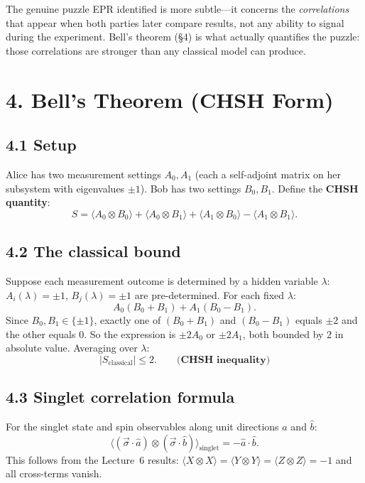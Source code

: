 \documentclass[12pt,a4paper]{article}
\begin{document}
The genuine puzzle EPR identified is more subtle---it concerns the \emph{correlations} that appear when both parties later compare results, not any ability to signal during the experiment.  Bell's theorem (\S4) is what actually quantifies the puzzle: those correlations are stronger than any classical model can produce.

\section{4. Bell's Theorem (CHSH Form)}

\subsection{4.1 Setup}
Alice has two measurement settings $A_0, A_1$ (each a self-adjoint matrix on her subsystem with eigenvalues $\pm 1$).  Bob has two settings $B_0, B_1$.  Define the \textbf{CHSH quantity}:
\[
    \boxed{S = \langle A_0 \otimes B_0\rangle + \langle A_0 \otimes B_1\rangle + \langle A_1 \otimes B_0\rangle - \langle A_1 \otimes B_1\rangle.}
\]

\subsection{4.2 The classical bound}
Suppose each measurement outcome is determined by a hidden variable $\lambda$: $A_i(\lambda)=\pm 1$, $B_j(\lambda)=\pm 1$ are pre-determined.  For each fixed $\lambda$:
\[
    A_0(B_0+B_1)+A_1(B_0-B_1).
\]
Since $B_0,B_1\in\{\pm 1\}$, exactly one of $(B_0+B_1)$ and $(B_0-B_1)$ equals $\pm 2$ and the other equals $0$.  So the expression is $\pm 2A_0$ or $\pm 2A_1$, both bounded by $2$ in absolute value.  Averaging over $\lambda$:
\[
    \boxed{|S_{\text{classical}}|\leq 2. \qquad\textbf{(CHSH inequality)}}
\]

\subsection{4.3 Singlet correlation formula}
For the singlet state and spin observables along unit directions $\hat{a}$ and $\hat{b}$:
\[
    \langle (\vec{\sigma}\cdot\hat{a})\otimes(\vec{\sigma}\cdot\hat{b})\rangle_{\text{singlet}} = -\hat{a}\cdot\hat{b}.
\]
This follows from the Lecture~6 results: $\langle X\otimes X\rangle = \langle Y\otimes Y\rangle = \langle Z\otimes Z\rangle = -1$ and all cross-terms vanish.
\end{document}
